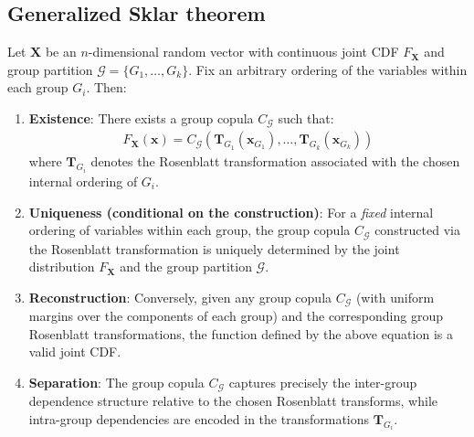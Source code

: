 \subsection{Generalized Sklar theorem}
\begin{theorem}
\label{thm:generalized_sklar}
Let $\mathbf{X}$ be an $n$-dimensional random vector with continuous joint CDF $F_{\mathbf{X}}$ and group partition $\mathcal{G} = \{G_1, \ldots, G_k\}$. Fix an arbitrary ordering of the variables within each group $G_i$. Then:
\begin{enumerate}
    \item \textbf{Existence}: There exists a group copula $C_{\mathcal{G}}$ such that:
    \begin{align}
    F_{\mathbf{X}}(\mathbf{x}) = C_{\mathcal{G}}(\mathbf{T}_{G_1}(\mathbf{x}_{G_1}), \ldots, \mathbf{T}_{G_k}(\mathbf{x}_{G_k}))
    \end{align}
    where $\mathbf{T}_{G_i}$ denotes the Rosenblatt transformation associated with the chosen internal ordering of $G_i$.

    \item \textbf{Uniqueness (conditional on the construction)}: For a \emph{fixed} internal ordering of variables within each group, the group copula $C_{\mathcal{G}}$ constructed via the Rosenblatt transformation is uniquely determined by the joint distribution $F_{\mathbf{X}}$ and the group partition $\mathcal{G}$.

    \item \textbf{Reconstruction}: Conversely, given any group copula $C_{\mathcal{G}}$ (with uniform margins over the components of each group) and the corresponding group Rosenblatt transformations, the function defined by the above equation is a valid joint CDF.

    \item \textbf{Separation}: The group copula $C_{\mathcal{G}}$ captures precisely the inter-group dependence structure relative to the chosen Rosenblatt transforms, while intra-group dependencies are encoded in the transformations $\mathbf{T}_{G_i}$.
\end{enumerate}
\end{theorem}
